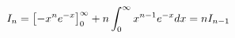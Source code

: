 \documentclass[preview]{standalone}
\begin{document}
\begin{align*}
\special{dvisvgm:raw <g id='unique000'>}I_n=\left[-x^ne^{-x}\right]_0^{\infty}+n\displaystyle\int_0^{\infty}x^{n-1}e^{-x}dx=nI_{n-1}\special{dvisvgm:raw </g>}
\end{align*}
\end{document}
